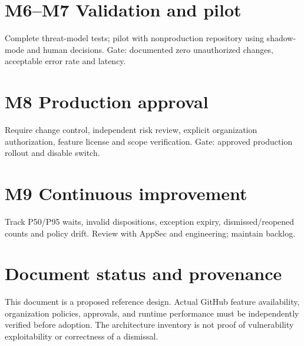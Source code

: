 \documentclass[11pt,letterpaper]{article}
\begin{document}
\section{M6–M7 Validation and pilot}
Complete threat-model tests; pilot with nonproduction repository using shadow-mode and human decisions. Gate: documented zero unauthorized changes, acceptable error rate and latency.


\section{M8 Production approval}
Require change control, independent risk review, explicit organization authorization, feature license and scope verification. Gate: approved production rollout and disable switch.


\section{M9 Continuous improvement}
Track P50/P95 waits, invalid dispositions, exception expiry, dismissed/reopened counts and policy drift. Review with AppSec and engineering; maintain backlog.


\section*{Document status and provenance}
This document is a proposed reference design. Actual GitHub feature availability, organization policies, approvals, and runtime performance must be independently verified before adoption. The architecture inventory is not proof of vulnerability exploitability or correctness of a dismissal.
\end{document}
